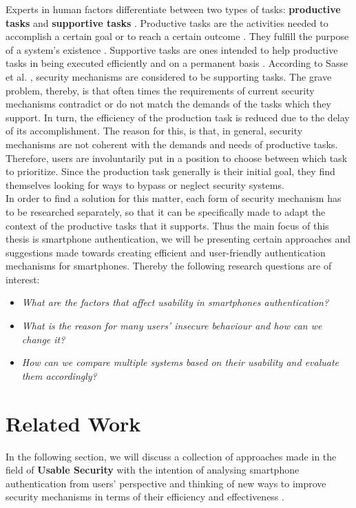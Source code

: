 Experts in human factors differentiate between two types of tasks: \textbf{productive tasks} and \textbf{supportive tasks} \cite{sasse}. Productive tasks are the activities needed to accomplish a certain goal or to reach a certain outcome \cite{sasse}. They fulfill the purpose of a system's existence \cite{sasse}. Supportive tasks are ones intended to help productive tasks in being executed efficiently and on a permanent basis \cite{sasse}. According to Sasse et al. \cite{sasse}, security mechanisms are considered to be supporting tasks. The grave problem, thereby, is that often times the requirements of current security mechanisms contradict or do not match the demands of the tasks which they support. In turn, the efficiency of the production task is reduced due to the delay of its accomplishment. The reason for this, is that, in general, security mechanisms are not coherent with the demands and needs of productive tasks. Therefore, users are involuntarily put in a position to choose between which task to prioritize. Since the production task generally is their initial goal, they find themselves looking for ways to bypass or neglect security systems. \\

In order to find a solution for this matter, each form of security mechanism has to be researched separately, so that it can be specifically made to adapt the context of the productive tasks that it supports. Thus the main focus of this thesis is smartphone authentication, we will be presenting certain approaches and suggestions made towards creating efficient and user-friendly authentication mechanisms for smartphones. Thereby the following research questions are of interest: 


\begin{itemize}
    \item \textit{What are the factors that affect usability in smartphones authentication?}
\item \textit{What is the reason for many users' insecure behaviour and how can we change it?} 
    \item \textit{How can we compare multiple systems based on their usability and evaluate them accordingly?}
\end{itemize}

\section{Related Work}

In the following section, we will discuss a collection of approaches made in the field of \textbf{Usable Security} with the intention of analysing smartphone authentication from users' perspective and thinking of new ways to improve security mechanisms in terms of their efficiency and effectiveness \cite{anonymous}. \\

